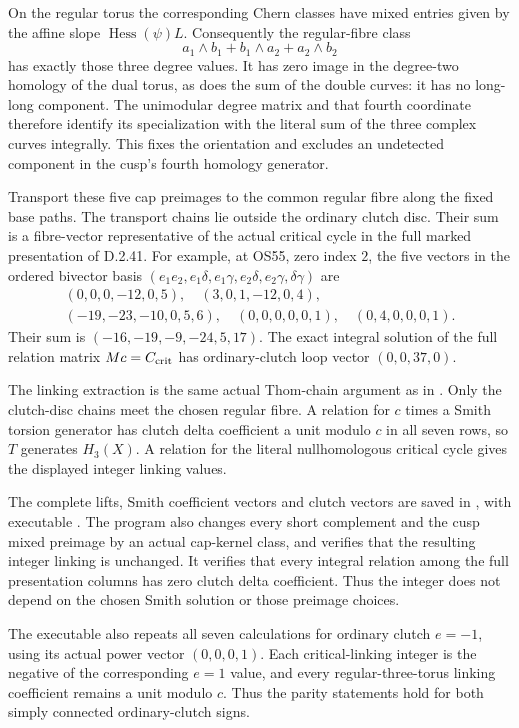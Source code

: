On the regular torus the corresponding Chern classes
have mixed entries given by the affine slope
$\operatorname{Hess}(\psi)L$.
Consequently the regular-fibre class
\[
                    a_1\wedge b_1+b_1\wedge a_2
                                      +a_2\wedge b_2
\]
has exactly those three degree values.
It has zero image in the degree-two homology of
the dual torus, as does the sum of the double
curves: it has no long-long component.
The unimodular degree matrix and that fourth
coordinate therefore identify its specialization
with the literal sum of the three complex curves
integrally. This fixes the orientation and excludes
an undetected component in the cusp's fourth
homology generator.

Transport these five cap preimages to the common
regular fibre along the fixed base paths. The
transport chains lie outside the ordinary clutch
disc. Their sum is a fibre-vector representative
of the actual critical cycle in the full marked
presentation of D.2.41.
For example, at OS55, zero index $2$, the five
vectors in the ordered bivector basis
$(e_1e_2,e_1\delta,e_1\gamma,e_2\delta,e_2\gamma,\delta\gamma)$
are
\[
 \begin{gathered}
 (0,0,0,-12,0,5),\quad (3,0,1,-12,0,4),\\
 (-19,-23,-10,0,5,6),\quad
 (0,0,0,0,0,1),\quad (0,4,0,0,0,1).
 \end{gathered}
\]
Their sum is $(-16,-19,-9,-24,5,17)$.
The exact integral solution of the full relation
matrix $Mc=C_{\rm crit}$ has ordinary-clutch
loop vector $(0,0,37,0)$.

The linking extraction is the same actual Thom-chain
argument as in
.
Only the clutch-disc chains meet the chosen regular
fibre. A relation for $c$ times a Smith torsion
generator has clutch delta coefficient a unit
modulo $c$ in all seven rows, so $T$ generates
$H_3(X)$. A relation for the literal nullhomologous
critical cycle gives the displayed integer linking
values.

The complete lifts, Smith coefficient vectors and
clutch vectors are saved in
,
with executable
.
The program also changes every short complement
and the cusp mixed preimage by an actual cap-kernel
class, and verifies that the resulting integer
linking is unchanged. It verifies that every
integral relation among the full presentation
columns has zero clutch delta coefficient.
Thus the integer does not depend on the chosen
Smith solution or those preimage choices.

The executable also repeats all seven calculations for ordinary
clutch $e=-1$, using its actual power vector $(0,0,0,1)$.
Each critical-linking integer is the negative of the corresponding
$e=1$ value, and every regular-three-torus linking coefficient
remains a unit modulo $c$. Thus the parity statements hold for
both simply connected ordinary-clutch signs.
